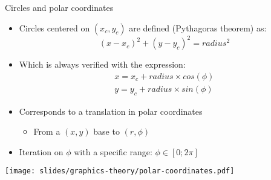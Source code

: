 \begin{frame}{Circles and polar coordinates}
  \begin{itemize}
  \item Circles centered on \((x_c,y_c)\) are defined (Pythagoras theorem) as:
\[
(x - x_c)^2+(y - y_c)^2 = radius^2
\]
  \end{itemize}
  \begin{minipage}{0.70\textwidth}
  \begin{itemize}
  \item Which is always verified with the expression:
\begin{gather*}
x = x_c + radius \times cos(\phi)\\
y = y_c + radius \times sin(\phi)
\end{gather*}
  \item Corresponds to a translation in polar coordinates
    \begin{itemize}
    \item From a \((x,y)\) base to \((r,\phi)\)
    \end{itemize}
  \item Iteration on \(\phi\) with a specific range: \(\phi \in [0;2\pi]\)
  \end{itemize}
  \end{minipage}
  \hfill
  \begin{minipage}{0.25\textwidth}
    \centering
    \texttt{[image: slides/graphics-theory/polar-coordinates.pdf]}
  \end{minipage}
\end{frame}

